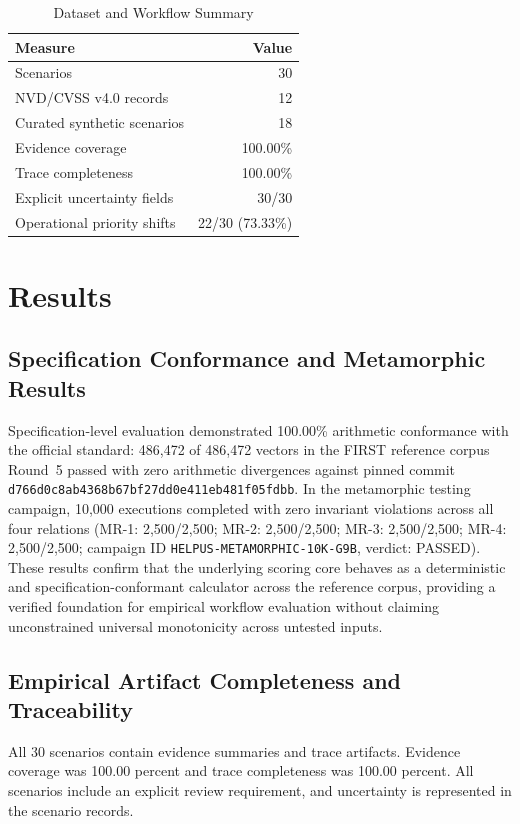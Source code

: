 \documentclass[conference]{IEEEtran}
\begin{document}
\begin{table}[t]
\caption{Dataset and Workflow Summary}
\label{tab:summary}
\centering
\small
\begin{tabular}{@{}lr@{}}
\toprule
Measure & Value \\
\midrule
Scenarios & 30 \\
NVD/CVSS v4.0 records & 12 \\
Curated synthetic scenarios & 18 \\
Evidence coverage & 100.00\% \\
Trace completeness & 100.00\% \\
Explicit uncertainty fields & 30/30 \\
Operational priority shifts & 22/30 (73.33\%) \\
\bottomrule
\end{tabular}
\end{table}

\section{Results}

\subsection{Specification Conformance and Metamorphic Results}

Specification-level evaluation demonstrated 100.00\% arithmetic conformance with the
official standard: 486,472 of 486,472 vectors in the FIRST reference corpus Round~5 passed with
zero arithmetic divergences against pinned commit \texttt{d766d0c8ab4368b67bf27dd0e411eb481f05fdbb}.
In the metamorphic testing campaign, 10,000 executions completed with zero invariant violations
across all four relations (MR-1: 2,500/2,500; MR-2: 2,500/2,500; MR-3: 2,500/2,500; MR-4: 2,500/2,500;
campaign ID \texttt{HELPUS-METAMORPHIC-10K-G9B}, verdict: PASSED). These results confirm that the underlying scoring core behaves as a deterministic and specification-conformant calculator across the reference corpus, providing a verified foundation for empirical workflow evaluation without claiming unconstrained universal monotonicity across untested inputs.


\subsection{Empirical Artifact Completeness and Traceability}

All 30 scenarios contain evidence summaries and trace
artifacts. Evidence coverage was 100.00 percent and trace
completeness was 100.00 percent. All scenarios include an explicit
review requirement, and uncertainty is represented in the scenario records.
\end{document}
